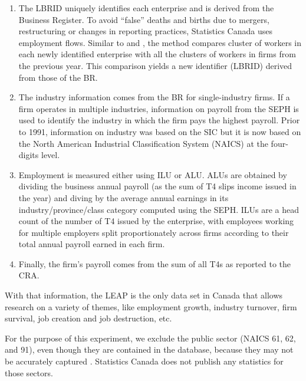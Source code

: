 \begin{enumerate}

\item The LBRID uniquely identifies each enterprise and is derived from the Business Register. To avoid ``false'' deaths and births due to mergers, restructuring or changes in reporting practices, Statistics Canada uses employment flows. Similar to \citet{BenedettoEtAl2007} and \citet{RePEc:iab:iabfme:201006_en}, the method  compares cluster of workers in each newly identified enterprise with all the clusters of workers in firms from the previous year. This comparison yields a new identifier (LBRID) derived from those of the \ac{BR}.

\item The industry information comes from the \ac{BR} for single-industry firms. If a firm operates in multiple industries, information on payroll from the \ac{SEPH} is used to identify the industry in which the firm pays the highest payroll. Prior to 1991, information on industry was based on the SIC but it is now based on the  North American Industrial Classification System (NAICS) at the four-digits level. 

\item Employment is measured either using \ac{ILU} or \ac{ALU}. \acp{ALU} are obtained by dividing the business annual payroll (as the sum of T4 slips income issued in the year) and diving by the average annual earnings in its industry/province/class category computed using the \ac{SEPH}. \acp{ILU} are a head count of the number of T4 issued by the enterprise, with employees working for multiple employers split proportionately across firms according to their total annual payroll earned in each firm. 

\item Finally, the firm's payroll comes from the sum of all T4s as reported to the CRA.

\end{enumerate}
With that information, the \ac{LEAP} is the only data set in Canada  that allows research on a variety of themes, like employment growth, industry turnover, firm survival, job creation and job destruction, etc. 

For the purpose of this experiment,  we exclude the public sector (NAICS 61, 62, and 91), even though they are contained in the database, because they may not be accurately captured \citet{StatisticsCanada2019}. Statistics Canada does not publish any statistics for those sectors.